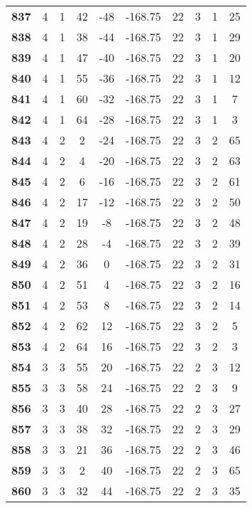 \documentclass{article}%
\begin{document}
\begin{longtable}{cccccccccc}
        \textbf{837} & 4 & 1 & 42 & -48 & -168.75 & 22 & 3 & 1 & 25 \\ 
        \textbf{838} & 4 & 1 & 38 & -44 & -168.75 & 22 & 3 & 1 & 29 \\ 
        \textbf{839} & 4 & 1 & 47 & -40 & -168.75 & 22 & 3 & 1 & 20 \\ 
        \textbf{840} & 4 & 1 & 55 & -36 & -168.75 & 22 & 3 & 1 & 12 \\ 
        \textbf{841} & 4 & 1 & 60 & -32 & -168.75 & 22 & 3 & 1 & 7 \\ 
        \textbf{842} & 4 & 1 & 64 & -28 & -168.75 & 22 & 3 & 1 & 3 \\ 
        \textbf{843} & 4 & 2 & 2 & -24 & -168.75 & 22 & 3 & 2 & 65 \\ 
        \textbf{844} & 4 & 2 & 4 & -20 & -168.75 & 22 & 3 & 2 & 63 \\ 
        \textbf{845} & 4 & 2 & 6 & -16 & -168.75 & 22 & 3 & 2 & 61 \\ 
        \textbf{846} & 4 & 2 & 17 & -12 & -168.75 & 22 & 3 & 2 & 50 \\ 
        \textbf{847} & 4 & 2 & 19 & -8 & -168.75 & 22 & 3 & 2 & 48 \\ 
        \textbf{848} & 4 & 2 & 28 & -4 & -168.75 & 22 & 3 & 2 & 39 \\ 
        \textbf{849} & 4 & 2 & 36 & 0 & -168.75 & 22 & 3 & 2 & 31 \\ 
        \textbf{850} & 4 & 2 & 51 & 4 & -168.75 & 22 & 3 & 2 & 16 \\ 
        \textbf{851} & 4 & 2 & 53 & 8 & -168.75 & 22 & 3 & 2 & 14 \\ 
        \textbf{852} & 4 & 2 & 62 & 12 & -168.75 & 22 & 3 & 2 & 5 \\ 
        \textbf{853} & 4 & 2 & 64 & 16 & -168.75 & 22 & 3 & 2 & 3 \\ 
        \textbf{854} & 3 & 3 & 55 & 20 & -168.75 & 22 & 2 & 3 & 12 \\ 
        \textbf{855} & 3 & 3 & 58 & 24 & -168.75 & 22 & 2 & 3 & 9 \\ 
        \textbf{856} & 3 & 3 & 40 & 28 & -168.75 & 22 & 2 & 3 & 27 \\ 
        \textbf{857} & 3 & 3 & 38 & 32 & -168.75 & 22 & 2 & 3 & 29 \\ 
        \textbf{858} & 3 & 3 & 21 & 36 & -168.75 & 22 & 2 & 3 & 46 \\ 
        \textbf{859} & 3 & 3 & 2 & 40 & -168.75 & 22 & 2 & 3 & 65 \\ 
        \textbf{860} & 3 & 3 & 32 & 44 & -168.75 & 22 & 2 & 3 & 35 \\ 

\end{longtable}
\end{document}
